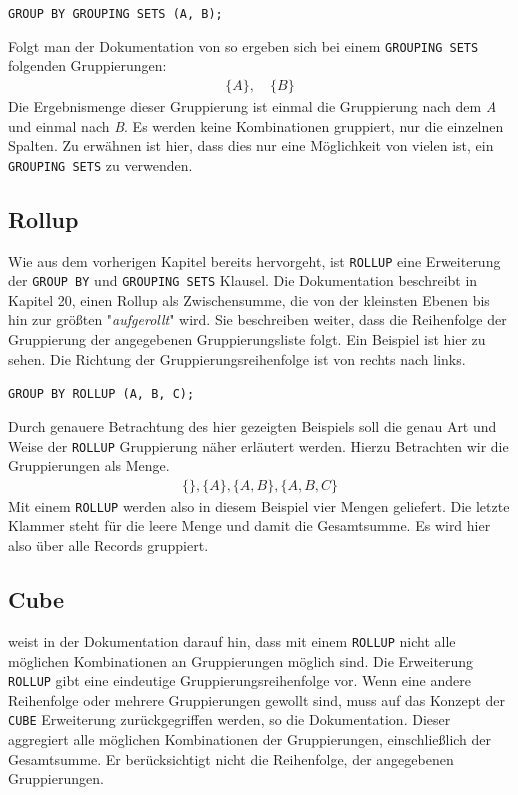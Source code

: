 \texttt{GROUP BY GROUPING SETS (A, B);}

Folgt man der Dokumentation von \cite{oracle16} so ergeben sich bei einem \texttt{GROUPING
SETS} folgenden Gruppierungen:
\begin{align*}
	\{A\}, \quad \{B\}
\end{align*}
Die Ergebnismenge dieser Gruppierung ist einmal die Gruppierung nach dem \textit{A}
und einmal nach \textit{B}. Es werden keine Kombinationen gruppiert, nur die einzelnen
Spalten. Zu erwähnen ist hier, dass dies nur eine Möglichkeit von vielen ist,
ein \texttt{GROUPING SETS} zu verwenden.

\subsection{Rollup}
Wie aus dem vorherigen Kapitel bereits hervorgeht, ist \texttt{ROLLUP} eine Erweiterung
der \texttt{GROUP BY} und \texttt{GROUPING SETS} Klausel. Die \cite{oracle16}
Dokumentation beschreibt in Kapitel 20, einen Rollup als Zwischensumme, die von
der kleinsten Ebenen bis hin zur größten "\textit{aufgerollt}" wird. Sie
beschreiben weiter, dass die Reihenfolge der Gruppierung der angegebenen Gruppierungsliste
folgt. Ein Beispiel ist hier zu sehen. Die Richtung der Gruppierungsreihenfolge ist
von rechts nach links.

\texttt{GROUP BY ROLLUP (A, B, C);}

Durch genauere Betrachtung des hier gezeigten Beispiels soll die genau Art und Weise
der \texttt{ROLLUP} Gruppierung näher erläutert werden. Hierzu Betrachten wir die
Gruppierungen als Menge.
\begin{align*}
	\{ \}, \{A\}, \{A, B\}, \{A, B, C\}
\end{align*}
Mit einem \texttt{ROLLUP} werden also in diesem Beispiel vier Mengen geliefert.
Die letzte Klammer steht für die leere Menge und damit die Gesamtsumme. Es wird hier
also über alle Records gruppiert.

\subsection{Cube}
\cite{oracle16} weist in der Dokumentation darauf hin, dass mit einem \texttt{ROLLUP}
nicht alle möglichen Kombinationen an Gruppierungen möglich sind. Die
Erweiterung \texttt{ROLLUP} gibt eine eindeutige Gruppierungsreihenfolge vor.
Wenn eine andere Reihenfolge oder mehrere Gruppierungen gewollt sind, muss auf das
Konzept der \texttt{CUBE} Erweiterung zurückgegriffen werden, so die \cite{oracle16}
Dokumentation. Dieser aggregiert alle möglichen Kombinationen der Gruppierungen,
einschließlich der Gesamtsumme. Er berücksichtigt nicht die Reihenfolge, der angegebenen
Gruppierungen.

